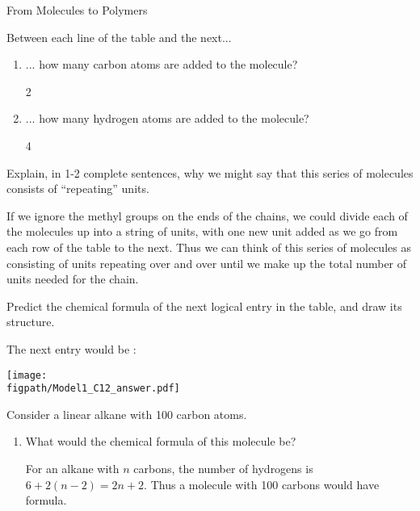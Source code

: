 \begin{activity}{From Molecules to Polymers}
\begin{ctqs}
	\question Between each line of the table and the next...
		\begin{enumerate}
			\item ... how many carbon atoms are added to the molecule?
			
				\begin{solution}[0.25in]{}
				2
				\end{solution}
				
			\item ... how many hydrogen atoms are added to the molecule?
			
				\begin{solution}[0.25in]{}
				4
				\end{solution}
				
		\end{enumerate}
		
	\question Explain, in 1-2 complete sentences, why we might say that this series of molecules consists of ``repeating''  units.
			
				\begin{solution}[1.75in]{}
					If we ignore the methyl groups on the ends of the chains, we could divide each of the molecules up into a string of  units, with one new unit added as we go from each row of the table to the next.  Thus we can think of this series of molecules as consisting of  units repeating over and over until we make up the total number of units needed for the chain.
				\end{solution}
				
		
	\question Predict the chemical formula of the next logical entry in the table, and draw its structure.
			
				\begin{solution}[1in]{}
					The next entry would be :
					
					\centerline{\texttt{[image: \\figpath/Model1\_C12\_answer.pdf]}}
				\end{solution}
		
	\question Consider a linear alkane with 100 carbon atoms. \label{\labelbase:ctq:100Calkane}
		\begin{enumerate}
			
			\item What would the chemical formula of this molecule be?
			
				\begin{solution}[1in]{}
					For an alkane with $n$ carbons, the number of hydrogens is $6+2(n-2) = 2n+2$.  Thus a molecule with 100 carbons would have formula\ce{C100H202}.
				\end{solution}
			

\end{enumerate}
\end{ctqs}
\end{activity}
